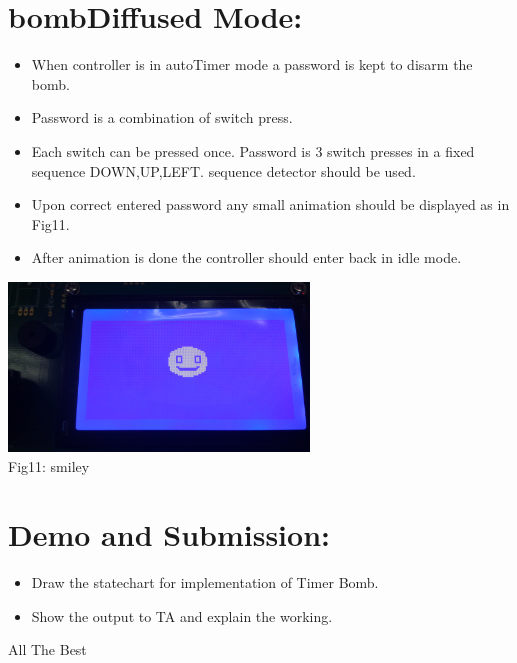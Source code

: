\documentclass{article}
\begin{document}
\section{bombDiffused Mode:}
\begin{itemize}
    \item When controller is in autoTimer mode a password is kept to disarm the bomb.
    \item Password is a combination of switch press.
    \item Each switch can be pressed once. Password is 3 switch presses in a fixed sequence DOWN,UP,LEFT. sequence detector should be used.
    \item Upon correct entered password any small animation should be displayed as in Fig11.
    \item After animation is done the controller should enter back in idle mode.
\end{itemize}
\begin{center}
   \includegraphics[width=8cm]{smiley}
   \\Fig11: smiley
   \\[2\baselineskip]
 \end{center}
\section{Demo and Submission:}
\begin{itemize}
    \item Draw the statechart for implementation of Timer Bomb.
    \item Show the output to TA and explain the working.
\end{itemize}
\begin{center}
\newline
   All The Best

 \end{center}
\end{document}
